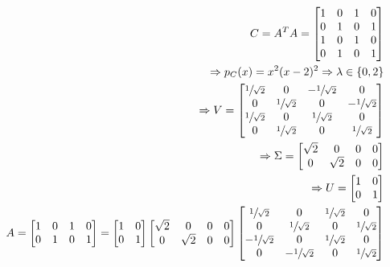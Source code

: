 \documentclass[leqno]{article}
\begin{document}
\begin{enumerate}
    \begin{align*}
        C=A^TA=\begin{bmatrix}
            1 & 0 & 1 & 0\\
            0 & 1 & 0 & 1\\
            1 & 0 & 1 & 0\\
            0 & 1 & 0 & 1\\
        \end{bmatrix}\\
        \Rightarrow p_C(x)=x^2(x-2)^2\Rightarrow\lambda\in\{0,2\}\\
        \Rightarrow V=\begin{bmatrix}
            \sfrac{1}{\sqrt{2}} & 0 & -\sfrac{1}{\sqrt{2}} & 0\\
            0 & \sfrac{1}{\sqrt{2}} & 0 & -\sfrac{1}{\sqrt{2}}\\
            \sfrac{1}{\sqrt{2}} & 0 & \sfrac{1}{\sqrt{2}} & 0\\
            0 & \sfrac{1}{\sqrt{2}} & 0 & \sfrac{1}{\sqrt{2}}\\
        \end{bmatrix}\\
        \Rightarrow \Sigma=\begin{bmatrix}
    \sqrt{2} & 0 & 0 & 0\\
    0 & \sqrt{2} & 0 & 0\\
    \end{bmatrix}\\
    \Rightarrow U=\begin{bmatrix}
            1 & 0\\
            0 & 1\\
        \end{bmatrix}\\
    A=\begin{bmatrix}
    1 & 0 & 1 & 0\\
    0 & 1 & 0 & 1\\
    \end{bmatrix}=\begin{bmatrix}
            1 & 0\\
            0 & 1\\
        \end{bmatrix}\begin{bmatrix}
    \sqrt{2} & 0 & 0 & 0\\
    0 & \sqrt{2} & 0 & 0\\
    \end{bmatrix}\begin{bmatrix}
            \sfrac{1}{\sqrt{2}} & 0 & \sfrac{1}{\sqrt{2}} & 0\\
            0 & \sfrac{1}{\sqrt{2}} & 0 & \sfrac{1}{\sqrt{2}}\\
            -\sfrac{1}{\sqrt{2}} & 0 & \sfrac{1}{\sqrt{2}} & 0\\
            0 & -\sfrac{1}{\sqrt{2}} & 0 & \sfrac{1}{\sqrt{2}}\\
        \end{bmatrix}\\
    \end{align*}
    
\end{enumerate}

 
\end{document}
